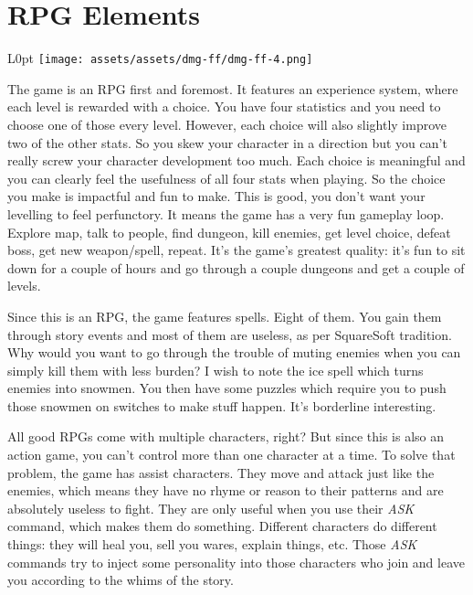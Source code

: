 \documentclass{book}
\begin{document}
\FloatBarrier\needspace{5pt}\section*{RPG Elements}\nopagebreak[4]

\begin{wrapfigure}{L}{0pt} \texttt{[image: assets/assets/dmg-ff/dmg-ff-4.png]}\end{wrapfigure}
The game is an RPG first and foremost. It features an experience system, where each level is rewarded with a choice. You have four statistics and you need to choose one of those every level. However, each choice will also slightly improve two of the other stats. So you skew your character in a direction but you can’t really screw your character development too much. Each choice is meaningful and you can clearly feel the usefulness of all four stats when playing. So the choice you make is impactful and fun to make. This is good, you don’t want your levelling to feel perfunctory. It means the game has a very fun gameplay loop. Explore map, talk to people, find dungeon, kill enemies, get level choice, defeat boss, get new weapon/spell, repeat. It’s the game’s greatest quality: it’s fun to sit down for a couple of hours and go through a couple dungeons and get a couple of levels.

Since this is an RPG, the game features spells. Eight of them. You gain them through story events and most of them are useless, as per SquareSoft tradition. Why would you want to go through the trouble of muting enemies when you can simply kill them with less burden? I wish to note the ice spell which turns enemies into snowmen. You then have some puzzles which require you to push those snowmen on switches to make stuff happen. It’s borderline interesting.

All good RPGs come with multiple characters, right? But since this is also an action game, you can’t control more than one character at a time. To solve that problem, the game has assist characters. They move and attack just like the enemies, which means they have no rhyme or reason to their patterns and are absolutely useless to fight. They are only useful when you use their \emph{ASK} command, which makes them do something. Different characters do different things: they will heal you, sell you wares, explain things, etc. Those \emph{ASK} commands try to inject some personality into those characters who join and leave you according to the whims of the story.
\end{document}
